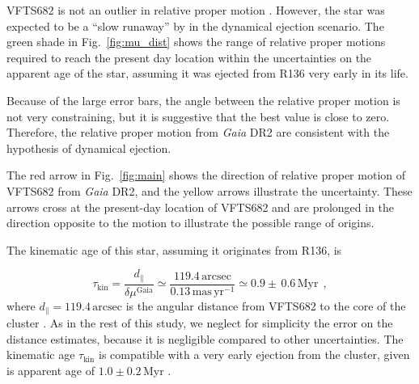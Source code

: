 \documentclass[apjl,twocolumn]{emulateapj}
\newcommand{\masyr}{\,\mathrm{mas}\,\mathrm{yr}^{-1}}
\DeclareRobustCommand{\Eqref}[1]{Eq.~\ref{#1}}
\DeclareRobustCommand{\Figref}[1]{Fig.~\ref{#1}}
\begin{document}
VFTS682 is not an outlier in relative proper motion%
. However, the star was expected to be a ``slow runaway'' by \citet{bestenlehner:11} in
the dynamical ejection scenario. The green shade in
\Figref{fig:mu_dist} shows the range of relative proper motions
required to reach the present day location within
the uncertainties on the apparent age of the star, assuming it was
ejected from R136 very early in its life.

Because of the large
error bars, the angle between the relative proper motion is not very
constraining, but it is suggestive that the best value is close to zero.
Therefore, the relative proper motion from \emph{Gaia} DR2 are consistent with the hypothesis
of dynamical ejection.





The red arrow in \Figref{fig:main} shows the direction of relative proper motion of
VFTS682 from \emph{Gaia} DR2, and the
yellow arrows illustrate the uncertainty. %
These arrows cross at the present-day location of VFTS682 and
are prolonged in the direction opposite to the motion to illustrate
the possible range of origins. %


The kinematic age of this star, assuming it originates from R136, is

\begin{equation}
  \label{eq:kin_age}
  \tau_\mathrm{kin} = \frac{d_\parallel}{\delta\mu^\mathrm{Gaia}} \simeq
  \frac{119.4\,\mathrm{arcsec}}{0.13\masyr} \simeq 0.9\pm\,0.6\, \mathrm{Myr} \ \ ,
\end{equation}
where $d_\parallel = 119.4\,\mathrm{arcsec}$ is the angular distance from VFTS682 to
the core of the cluster \citep[corresponding to $\sim$29\,pc at LMC distance,][]{bestenlehner:11}.
As in the rest of this study, we neglect for
simplicity the error on the distance estimates, because it is negligible compared to other uncertainties.
The kinematic age $\tau_\mathrm{kin}$ is compatible with a very early
ejection from the cluster, given is apparent age
of $1.0\pm 0.2$\,Myr \citep{schneider:18}. %
\end{document}
